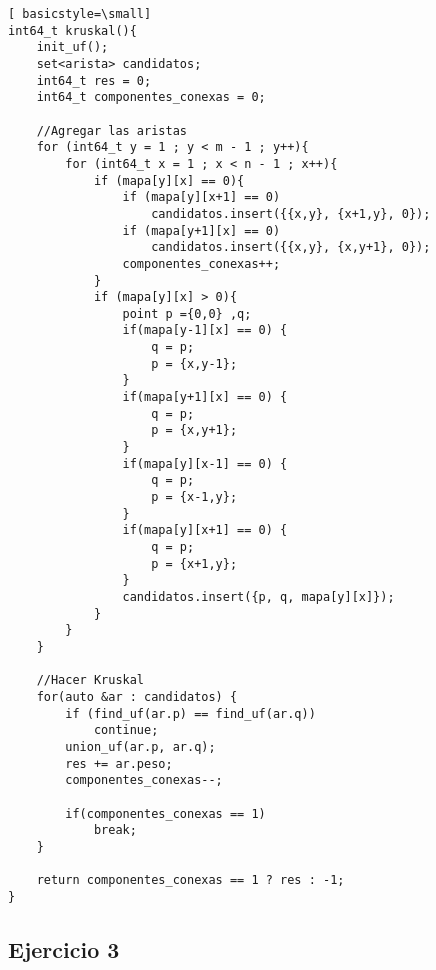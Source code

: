 \begin{lstlisting}[ basicstyle=\small]
int64_t kruskal(){
    init_uf();
    set<arista> candidatos;
    int64_t res = 0;
    int64_t componentes_conexas = 0;

    //Agregar las aristas
    for (int64_t y = 1 ; y < m - 1 ; y++){
        for (int64_t x = 1 ; x < n - 1 ; x++){
            if (mapa[y][x] == 0){
                if (mapa[y][x+1] == 0)
                    candidatos.insert({{x,y}, {x+1,y}, 0});
                if (mapa[y+1][x] == 0)
                    candidatos.insert({{x,y}, {x,y+1}, 0});
                componentes_conexas++;
            }
            if (mapa[y][x] > 0){
                point p ={0,0} ,q;
                if(mapa[y-1][x] == 0) {
                    q = p;
                    p = {x,y-1};
                } 
                if(mapa[y+1][x] == 0) {
                    q = p;
                    p = {x,y+1};
                } 
                if(mapa[y][x-1] == 0) {
                    q = p;
                    p = {x-1,y};
                } 
                if(mapa[y][x+1] == 0) {
                    q = p;
                    p = {x+1,y};
                }
                candidatos.insert({p, q, mapa[y][x]});
            }
        }
    }

    //Hacer Kruskal
    for(auto &ar : candidatos) {
        if (find_uf(ar.p) == find_uf(ar.q))
            continue;
        union_uf(ar.p, ar.q);
        res += ar.peso;
        componentes_conexas--;

        if(componentes_conexas == 1)
            break;
    }

    return componentes_conexas == 1 ? res : -1;
}

\end{lstlisting}

\newpage
\subsection{Ejercicio 3}

